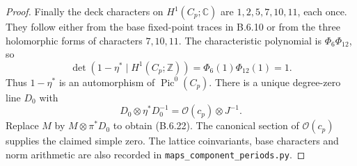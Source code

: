 \begin{proof}
Finally the deck characters on $H^1(C_p;\mathbb C)$ are
$1,2,5,7,10,11$, each once. They follow either from the
base fixed-point traces in B.6.10 or from the three
holomorphic forms of characters $7,10,11$.
The characteristic polynomial is $\Phi_6\Phi_{12}$, so
\[
 \det(1-\eta^*\mid H^1(C_p;\mathbb Z))
      =\Phi_6(1)\Phi_{12}(1)=1.
\]
Thus $1-\eta^*$ is an automorphism of $\operatorname{Pic}^0(C_p)$.
There is a unique degree-zero line $D_0$ with
\[
 D_0\otimes\eta^*D_0^{-1}
       =\mathcal O(c_p)\otimes J^{-1}.
\]
Replace $M$ by $M\otimes\pi^*D_0$ to obtain (B.6.22).
The canonical section of $\mathcal O(c_p)$ supplies the
claimed simple zero. The lattice coinvariants, base
characters and norm arithmetic are also recorded in
\texttt{maps\_component\_periods.py}.
\end{proof}



